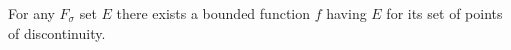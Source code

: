 For any $F_\sigma$ set $E$ there exists a bounded function $f$ having $E$ for its set of points of discontinuity.
